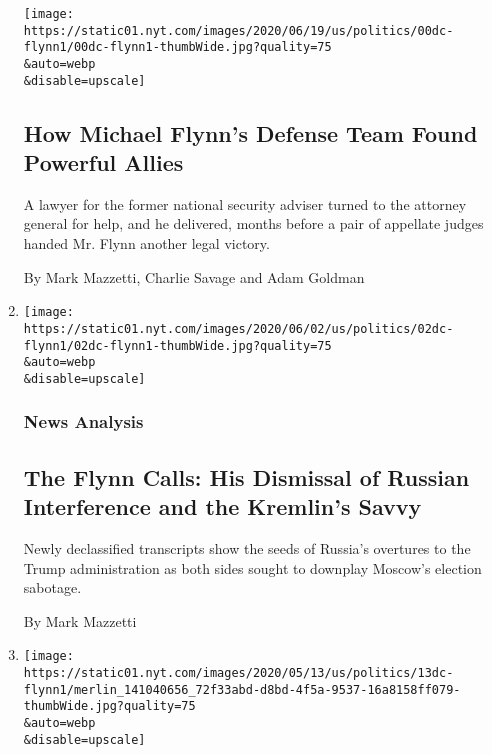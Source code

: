 \begin{enumerate}
  \texttt{[image: https://static01.nyt.com/images/2020/06/19/us/politics/00dc-flynn1/00dc-flynn1-thumbWide.jpg?quality=75\\\&auto=webp\\\&disable=upscale]}

  \hypertarget{how-michael-flynns-defense-team-found-powerful-allies}{%
  \subsection{How Michael Flynn's Defense Team Found Powerful
  Allies}\label{how-michael-flynns-defense-team-found-powerful-allies}}

  A lawyer for the former national security adviser turned to the
  attorney general for help, and he delivered, months before a pair of
  appellate judges handed Mr. Flynn another legal victory.

  By Mark Mazzetti, Charlie Savage and Adam Goldman
\item
  \href{/2020/06/02/us/politics/michael-flynn-kislyak-calls.html}{}

  \texttt{[image: https://static01.nyt.com/images/2020/06/02/us/politics/02dc-flynn1/02dc-flynn1-thumbWide.jpg?quality=75\\\&auto=webp\\\&disable=upscale]}

  \hypertarget{news-analysis-1}{%
  \subsubsection{News Analysis}\label{news-analysis-1}}

  \hypertarget{the-flynn-calls-his-dismissal-of-russian-interference-and-the-kremlins-savvy}{%
  \subsection{The Flynn Calls: His Dismissal of Russian Interference and
  the Kremlin's
  Savvy}\label{the-flynn-calls-his-dismissal-of-russian-interference-and-the-kremlins-savvy}}

  Newly declassified transcripts show the seeds of Russia's overtures to
  the Trump administration as both sides sought to downplay Moscow's
  election sabotage.

  By Mark Mazzetti
\item
  \href{/2020/05/14/us/politics/trump-michael-flynn.html}{}

  \texttt{[image: https://static01.nyt.com/images/2020/05/13/us/politics/13dc-flynn1/merlin\_141040656\_72f33abd-d8bd-4f5a-9537-16a8158ff079-thumbWide.jpg?quality=75\\\&auto=webp\\\&disable=upscale]}


\end{enumerate}
